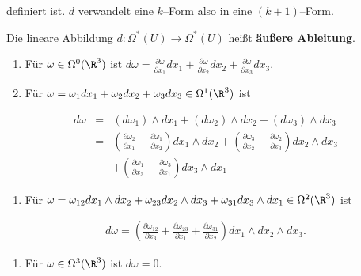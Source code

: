 \par
definiert ist. \(d\) verwandelt eine \(k\)–Form also in eine \((k+1)\)–Form.
\label{vektoranalysis/diffformen:aeussere Ableitung}
\begin{definition}{}{}



\par
Die lineare Abbildung \(d:\Omega^*(U)\to\Omega^*(U)\) heißt \href{https://de.wikipedia.org/wiki/\%C3\%84u\%C3\%9Fere\_Ableitung}{\textbf{äußere Ableitung}}.
\end{definition}
\label{vektoranalysis/diffformen:ex:10.14}
\begin{example}{}{}


\begin{enumerate}

\item {} 
\par
Für \(\omega\in\Omega^0(\R^3)\) ist \(d\omega = \frac{\partial\omega}{\partial x_1}dx_1+
\frac{\partial\omega}{\partial x_2}dx_2+\frac{\partial\omega}{\partial x_3}dx_3\).

\item {} 
\par
Für \(\omega = \omega_1dx_1+\omega_2dx_2+\omega_3dx_3\in\Omega^1(\R^3)\) ist

\end{enumerate}
\begin{align*}
d\omega &=& (d\omega_1)\wedge dx_1+(d\omega_2)\wedge dx_2+(d\omega_3)\wedge
dx_3\\
&=& \left(\frac{\partial\omega_2}{\partial x_1}-\frac{\partial\omega_1}{\partial x_2}\right)
dx_1\wedge dx_2+ \left(\frac{\partial\omega_3}{\partial x_2}-\frac{\partial\omega_2}{\partial x_3}\right)
dx_2\wedge dx_3\\
&& + \left(\frac{\partial\omega_1}{\partial x_3}-\frac{\partial\omega_3}{\partial x_1}\right)
dx_3\wedge dx_1
\end{align*}\begin{enumerate}

\item {} 
\par
Für \(\omega = \omega_{12}dx_1\wedge dx_2+\omega_{23}dx_2\wedge dx_3
+\omega_{31}dx_3\wedge dx_1 \in\Omega^2(\R^3)\) ist

\end{enumerate}
\begin{align*}
d\omega = \left(\frac{\partial\omega_{12}}{\partial x_3} + \frac{\partial\omega_{23}}{\partial x_1}
+ \frac{\partial\omega_{31}}{\partial x_2}\right)dx_1\wedge dx_2\wedge dx_3.
\end{align*}\begin{enumerate}

\item {} 
\par
Für \(\omega\in\Omega^3(\R^3)\) ist \(d\omega=0\).

\end{enumerate}
\end{example}
